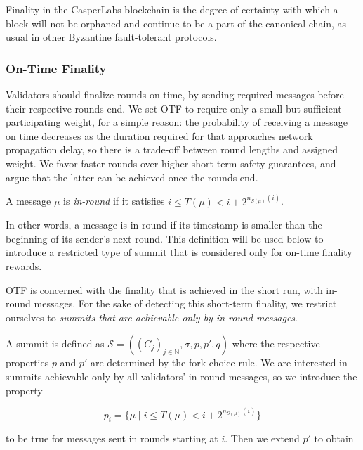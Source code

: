 Finality in the CasperLabs blockchain is the degree of certainty with which a block will not be orphaned and continue to be a part of the canonical chain, as usual in other Byzantine fault-tolerant protocols.

\subsubsection*{On-Time Finality}
\label{sec:on-time-finality}

Validators should finalize rounds on time, by sending required messages before their respective rounds end. We set OTF to require only a small but sufficient participating weight, for a simple reason: the probability of receiving a message on time decreases as the duration required for that approaches network propagation delay, so there is a trade-off between round lengths and assigned weight. We favor faster rounds over higher short-term safety guarantees, and argue that the latter can be achieved once the rounds end.

\begin{definition}[In-roundness]
  A message $\mu$ is \emph{in-round} if it satisfies
  $i \leq T(\mu)< i+2^{n_{S(\mu)}(i)}$.
\end{definition}

In other words, a message is in-round if its timestamp is smaller than the beginning of its sender's next round. This definition will be used below to introduce a restricted type of summit that is considered only for on-time finality rewards.



OTF is concerned with the finality that is achieved in the short run, with in-round messages. For the sake of detecting this short-term finality, we restrict ourselves to \emph{summits that are achievable only by in-round messages}.

A summit is defined as $\mathcal{S}=((C_j)_{j\in\mathbb{N}}, \sigma,p,p',q)$ where the respective properties $p$ and $p'$ are determined by the fork choice rule. We are interested in summits achievable only by all validators' in-round messages, so we introduce the property

\begin{equation}
  p_{i} = \{\mu \mid i \leq T(\mu)< i+2^{n_{S(\mu)}(i)}\}
\end{equation}

to be true for messages sent in rounds starting at $i$. Then we extend $p'$ to obtain

